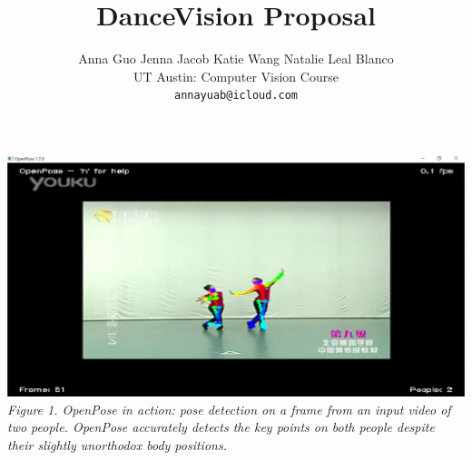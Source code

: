 \documentclass[10pt,twocolumn,letterpaper]{article}
\title{DanceVision Proposal}
\author{Anna Guo \qquad Jenna Jacob \qquad Katie Wang \qquad Natalie Leal Blanco\\
UT Austin: Computer Vision Course\\
{\tt\small annayuab@icloud.com}\\
\and
}
\begin{document}
\maketitle
    




\includegraphics[width=\columnwidth]{sec/openpose_demo}
\textit{Figure 1. OpenPose in action: pose detection on a frame from an input video of two people. 
OpenPose accurately detects the key points on both people despite their slightly unorthodox body positions.}

 

\pagebreak
% 
% 
\nocite{*}
{
    \small
    
    
}

% 
\end{document}
